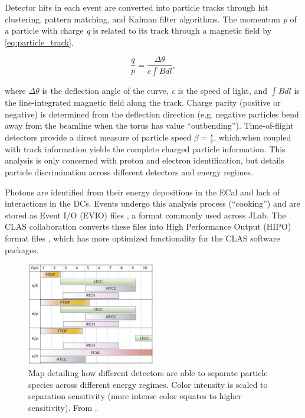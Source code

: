     Detector hits in each event are converted into particle tracks through hit clustering, pattern matching, and Kalman filter algorithms. The momentum \textit{p} of a particle with charge \textit{q} is related to its track through a magnetic field by \eqref{eq:particle_track},
    
    \begin{equation}\label{eq:particle_track}
        \frac{q}{p} = \frac{\Delta \theta}{c \int B dl},
    \end{equation}

    \noindent where $\Delta \theta$ is the deflection angle of the curve, \textit{c} is the speed of light, and $\int B dl$ is the line-integrated magnetic field along the track. Charge parity (positive or negative) is determined from the deflection direction (e.g. negative particles bend away from the beamline when the torus has value ``outbending''). Time-of-flight detectors provide a direct measure of particle speed $\beta = \frac{v}{c}$, which,when coupled with track information yields the complete charged particle information. This analysis is only concerned with proton and electron identification, but  details particle discrimination across different detectors and energy regimes.
    
    Photons are identified from their energy depositions in the ECal and lack of interactions in the DCs. Events undergo this analysis process (``cooking'') and are stored as Event I/O (EVIO) files \parencite{Wolin2007EVIOPackage}, a format commonly used across JLab. The CLAS collaboration converts these files into High Performance Output (HIPO) format files \parencite{Ziegler2020TheReconstruction}, which has more optimized functionality for the CLAS software packages. 

    \begin{figure}[H]
        \centering
         \includegraphics[width=0.5\textwidth]{Chapters/Ch2-Experiment/recon_pid/pid_figs/pid-clas12-new.png}
        \caption[Particle Separation by Detector]{Map detailing how different detectors are able to separate particle species across different energy regimes. Color intensity is scaled to separation sensitivity (more intense color equates to higher sensitivity). From \parencite{Burkert2020TheLaboratory}.}
        \label{fig:clas12-pid-overview}
    \end{figure}


